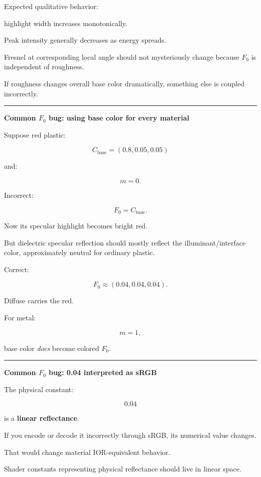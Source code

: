Expected qualitative behavior:

highlight width increases monotonically.

Peak intensity generally decreases as energy spreads.

Fresnel at corresponding local angle should not mysteriously change because \(F_0\) is independent of roughness.

If roughness changes overall base color dramatically, something else is coupled incorrectly.

\begin{center}\rule{0.5\linewidth}{0.5pt}\end{center}

\textbf{Common \(F_0\) bug: using base color for every material}

Suppose red plastic:

\[
C_{\text{base}}=(0.8,0.05,0.05)
\]

and:

\[
m=0.
\]

Incorrect:

\[
F_0=C_{\text{base}}.
\]

Now its specular highlight becomes bright red.

But dielectric specular reflection should mostly reflect the illuminant/interface color, approximately neutral for ordinary plastic.

Correct:

\[
F_0\approx(0.04,0.04,0.04).
\]

Diffuse carries the red.

For metal:

\[
m=1,
\]

base color \emph{does} become colored \(F_0\).

\begin{center}\rule{0.5\linewidth}{0.5pt}\end{center}

\textbf{Common \(F_0\) bug: 0.04 interpreted as sRGB}

The physical constant:

\[
0.04
\]

is a \textbf{linear reflectance}.

If you encode or decode it incorrectly through sRGB, its numerical value changes.

That would change material IOR-equivalent behavior.

Shader constants representing physical reflectance should live in linear space.

